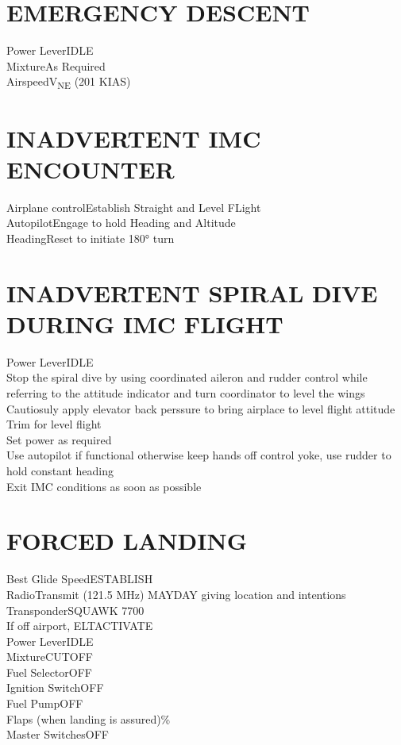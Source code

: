 \documentclass{article}
\begin{document}
\begin{multicols*}{2}
\section*{EMERGENCY DESCENT}
Power Lever\dotfill IDLE\\
Mixture\dotfill As Required\\
Airspeed\dotfill V\textsubscript{NE} (201 KIAS)
\section*{INADVERTENT IMC ENCOUNTER}
Airplane control\dotfill Establish Straight and Level FLight\\
Autopilot\dotfill Engage to hold Heading and Altitude\\
Heading\dotfill Reset to initiate 180° turn
\section*{INADVERTENT SPIRAL DIVE DURING IMC FLIGHT}
Power Lever\dotfill IDLE\\
Stop the spiral dive by using coordinated aileron and rudder control while referring to the attitude indicator and turn coordinator to level the wings\\
Cautiosuly apply elevator back perssure to bring airplace to level flight attitude\\
Trim for level flight\\
Set power as required\\
Use autopilot if functional otherwise keep hands off control yoke, use rudder to hold constant heading\\
Exit IMC conditions as soon as possible
\section*{FORCED LANDING}
Best Glide Speed\dotfill ESTABLISH\\
Radio\dotfill Transmit (121.5 MHz) MAYDAY giving location and intentions\\
Transponder\dotfill SQUAWK 7700\\
If off airport, ELT\dotfill ACTIVATE\\
Power Lever\dotfill IDLE\\
Mixture\dotfill CUTOFF\\
Fuel Selector\dotfill OFF\\
Ignition Switch\dotfill OFF\\
Fuel Pump\dotfill OFF\\
Flaps (when landing is assured)\%\\
Master Switches\dotfill OFF

\end{multicols*}
\end{document}
